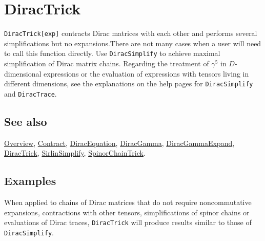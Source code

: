 \documentclass[../FeynCalcManual.tex]{subfiles}
\begin{document}
\hypertarget{diractrick}{
\section{DiracTrick}\label{diractrick}}

\texttt{DiracTrick[\allowbreak{}exp]} contracts Dirac matrices with each
other and performs several simplifications but no expansions.There are
not many cases when a user will need to call this function directly. Use
\texttt{DiracSimplify} to achieve maximal simplification of Dirac matrix
chains. Regarding the treatment of \(\gamma^5\) in \(D\)-dimensional
expressions or the evaluation of expressions with tensors living in
different dimensions, see the explanations on the help pages for
\texttt{DiracSimplify} and \texttt{DiracTrace}.

\subsection{See also}

\hyperlink{toc}{Overview}, \hyperlink{contract}{Contract},
\hyperlink{diracequation}{DiracEquation},
\hyperlink{diracgamma}{DiracGamma},
\hyperlink{diracgammaexpand}{DiracGammaExpand},
\hyperlink{diractrick}{DiracTrick},
\hyperlink{sirlinsimplify}{SirlinSimplify},
\hyperlink{spinorchaintrick}{SpinorChainTrick}.

\subsection{Examples}

When applied to chains of Dirac matrices that do not require
noncommutative expansions, contractions with other tensors,
simplifications of spinor chains or evaluations of Dirac traces,
\texttt{DiracTrick} will produce results similar to those of
\texttt{DiracSimplify}.

\begin{Shaded}
\begin{Highlighting}[]
\OperatorTok{[}\SpecialCharTok{\textbackslash{}}\OperatorTok{[}\OperatorTok{],} \SpecialCharTok{\textbackslash{}}\OperatorTok{[}\OperatorTok{],} \SpecialCharTok{\textbackslash{}}\OperatorTok{[}\OperatorTok{]]} 
 
\OperatorTok{[}\SpecialCharTok{\%}\OperatorTok{]}
\end{Highlighting}
\end{Shaded}
\end{document}
